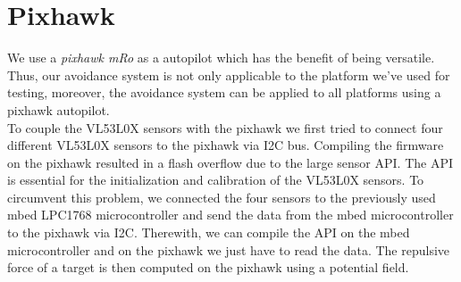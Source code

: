 \section{Pixhawk}
\label{sec:pixhawk}
We use a \textit{pixhawk mRo} as a autopilot which has the benefit of being versatile. Thus, our avoidance system is not only applicable to the platform we've used for testing, moreover, the avoidance system can be applied to all platforms using a pixhawk autopilot.\\
To couple the VL53L0X sensors with the pixhawk we first tried to connect four different VL53L0X sensors to the pixhawk via I2C bus. Compiling the firmware on the pixhawk resulted in a flash overflow due to the large sensor API. The API is essential for the initialization and calibration of the VL53L0X sensors. To circumvent this problem, we connected the four sensors to the previously used mbed LPC1768 microcontroller and send the data from the mbed microcontroller to the pixhawk via I2C. Therewith, we can compile the API on the mbed microcontroller and on the pixhawk we just have to read the data. The repulsive force of a target is then computed on the pixhawk using a potential field.



